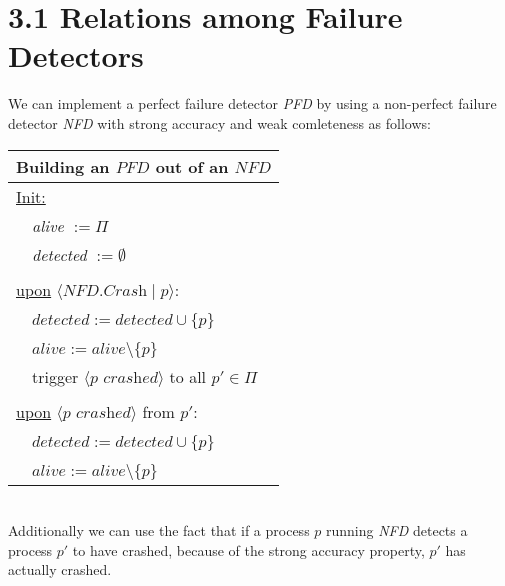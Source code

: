 \documentclass{article}
\begin{document}
	\pagestyle{fancy}
	
	\section*{3.1 Relations among Failure Detectors}
	\begin{adjustwidth}{2em}{2em}
		We can implement a perfect failure detector \textit{PFD} by using a non-perfect failure detector \textit{NFD} with strong accuracy and weak comleteness as follows: \\
		\begin{center}
			\begin{tabular}{|l|}
				\hline
				Building an $PFD$ out of an $NFD$ \\
				\hline
				\underline{Init:} \\
				\ \ \textit{alive} $:= \Pi$ \\
				\ \ \textit{detected} $:= \emptyset$ \\
				\\
				\underline{upon} $\langle \textit{NFD}.\textit{Crash} \mid p \rangle$: \\
				\ \ $\textit{detected} := \textit{detected} \cup \{p\}$ \\
      			\ \ $\textit{alive} := \textit{alive} \setminus \{p\}$ \\
      			\ \ trigger $\langle \textit{p crashed} \rangle$ to all $p' \in \Pi$ \\
      			\\
      			\underline{upon} $\langle \textit{p crashed} \rangle$ from $p'$: \\
      			\ \ $\textit{detected} := \textit{detected} \cup \{p\}$ \\
      			\ \ $\textit{alive} := \textit{alive} \setminus \{p\}$ \\
      			\hline
			\end{tabular}
		\end{center}
		\hfill \\
		Additionally we can use the fact that if a process $p$ running \textit{NFD} detects a process $p'$ to have crashed, because of the strong accuracy property, $p'$ has actually crashed.
	\end{adjustwidth}
	
\end{document}
